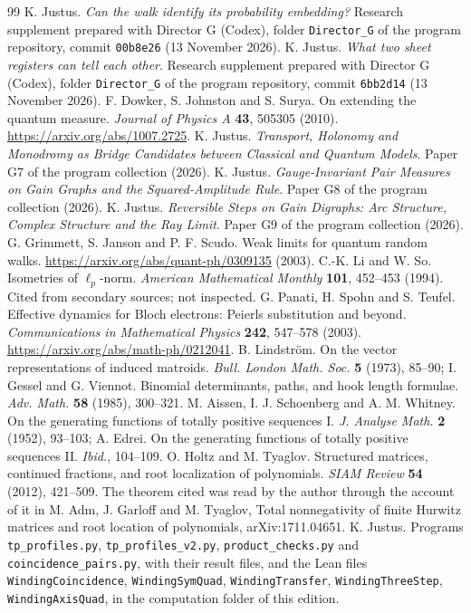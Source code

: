 \documentclass[11pt,a4paper]{article}
\begin{document}
\begin{thebibliography}{99}
 K. Justus. \emph{Can the walk identify its probability embedding?} Research supplement prepared with Director G (Codex), folder \texttt{Director\_G} of the program repository, commit \texttt{00b8e26} (13 November 2026).
 K. Justus. \emph{What two sheet registers can tell each other}. Research supplement prepared with Director G (Codex), folder \texttt{Director\_G} of the program repository, commit \texttt{6bb2d14} (13 November 2026).
 F. Dowker, S. Johnston and S. Surya. On extending the quantum measure. \emph{Journal of Physics A} \textbf{43}, 505305 (2010). \url{https://arxiv.org/abs/1007.2725}.
 K. Justus. \emph{Transport, Holonomy and Monodromy as Bridge Candidates between Classical and Quantum Models}. Paper G7 of the program collection (2026).
 K. Justus. \emph{Gauge-Invariant Pair Measures on Gain Graphs and the Squared-Amplitude Rule}. Paper G8 of the program collection (2026).
 K. Justus. \emph{Reversible Steps on Gain Digraphs: Arc Structure, Complex Structure and the Ray Limit}. Paper G9 of the program collection (2026).
 G. Grimmett, S. Janson and P. F. Scudo. Weak limits for quantum random walks. \url{https://arxiv.org/abs/quant-ph/0309135} (2003).
 C.-K. Li and W. So. Isometries of $\ell_p$-norm. \emph{American Mathematical Monthly} \textbf{101}, 452--453 (1994). Cited from secondary sources; not inspected.
 G. Panati, H. Spohn and S. Teufel. Effective dynamics for Bloch electrons: Peierls substitution and beyond. \emph{Communications in Mathematical Physics} \textbf{242}, 547--578 (2003). \url{https://arxiv.org/abs/math-ph/0212041}.
 B. Lindstr\"om. On the vector representations of induced matroids. \emph{Bull. London Math. Soc.} \textbf{5} (1973), 85--90; I. Gessel and G. Viennot. Binomial determinants, paths, and hook length formulae. \emph{Adv. Math.} \textbf{58} (1985), 300--321.
 M. Aissen, I. J. Schoenberg and A. M. Whitney. On the generating functions of totally positive sequences I. \emph{J. Analyse Math.} \textbf{2} (1952), 93--103; A. Edrei. On the generating functions of totally positive sequences II. \emph{Ibid.}, 104--109.
 O. Holtz and M. Tyaglov. Structured matrices, continued fractions, and root localization of polynomials. \emph{SIAM Review} \textbf{54} (2012), 421--509. The theorem cited was read by the author through the account of it in M. Adm, J. Garloff and M. Tyaglov, Total nonnegativity of finite Hurwitz matrices and root location of polynomials, arXiv:1711.04651.
 K. Justus. Programs \texttt{tp\_profiles.py}, \texttt{tp\_profiles\_v2.py}, \texttt{product\_checks.py} and \texttt{coincidence\_pairs.py}, with their result files, and the Lean files \texttt{WindingCoincidence}, \texttt{WindingSymQuad}, \texttt{WindingTransfer}, \texttt{WindingThreeStep}, \texttt{WindingAxisQuad}, in the computation folder of this edition.
\end{thebibliography}
\end{document}
